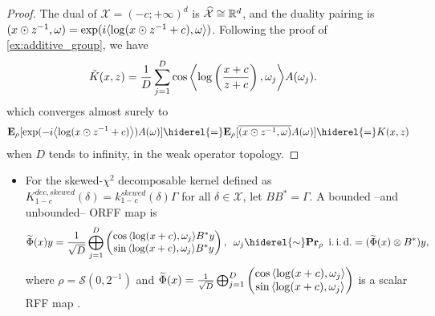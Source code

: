\begin{proof}
The dual of $\mathcal{X}=(-c;+\infty)^d$
is $\dual{\mathcal{X}}\cong\mathbb{R}^d$, and the duality pairing is $\pairing{x \odot \myinv{z},\omega}=\exp(i\inner{\log(x\odot z^{-1}+c), \omega})$. Following the proof of \cref{ex:additive_group}, we have
\begin{equation*}
\begin{aligned}
\tilde{K}(x,z)&= \frac{1}{D} \sum_{j=1}^D \cos{\inner*{\log\left(\frac{x+c}{z+c}\right), \omega_j}}A(\omega_j).
\end{aligned}
\end{equation*}
which converges almost surely to
\begin{dmath*}
\expectation_{\rho}[\exp(-i\inner*{\log(x\odot z^{-1}+c)})A(\omega) ]\hiderel{=}\expectation_{\rho}[\conj{\pairing{x\odot z^{-1},\omega}}A(\omega)]\hiderel{=}K(x, z)
\end{dmath*}
when $D$ tends to infinity, in the weak operator topology.
\end{proof}
\begin{itemize}
\item For the skewed-$\chi^2$ decomposable kernel defined as $K_{1-c}^{dec,skewed}(\delta)=k_{1-c}^{skewed}(\delta)\Gamma$ for all $\delta\in\mathcal{X}$, let $BB^*=\Gamma$. A bounded --and unbounded-- \acs{ORFF} map is
\begin{dmath*}
\tildePhi{\omega}(x)y=\frac{1}{\sqrt{D}}\Vect_{j=1}^D\begin{pmatrix}\cos{\inner{\log(x+c),\omega_j}}B^\adjoint y\\ \sin{\inner{\log(x+c),\omega_j}}B^\adjoint y\end{pmatrix}, \enskip \omega_j \hiderel{\sim} \probability_{\rho} \enskip\text{\iid}
=(\tildePhi{\omega}(x) \otimes B^\adjoint)y,
\end{dmath*}
where $\rho=\mathcal{S}(0,2^{-1})$ and $\tildePhi{\omega}(x)=\frac{1}{\sqrt{D}}\Vect_{j=1}^D\begin{pmatrix}\cos{\inner{\log(x+c),\omega_j}} \\ \sin{\inner{\log(x+c),\omega_j}}\end{pmatrix}$ is a scalar \acs{RFF} map \cite{li2010random}.
\end{itemize}
